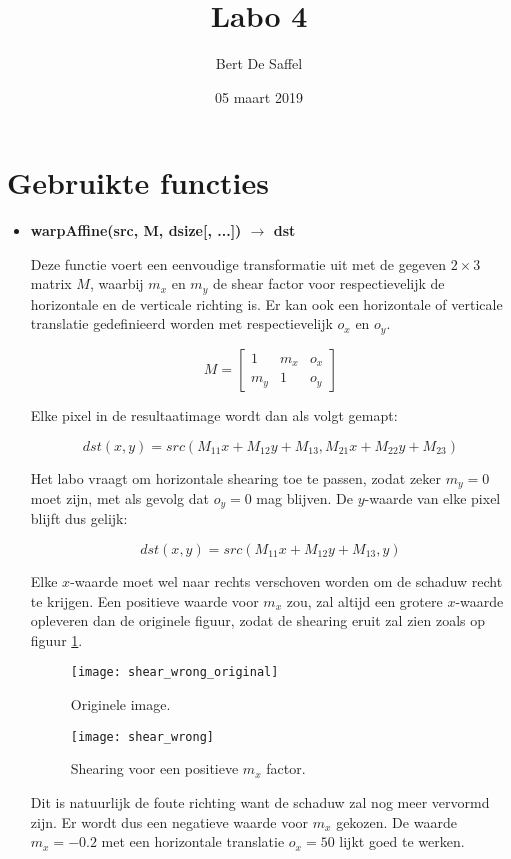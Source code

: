 \documentclass{article}
\begin{document}
	\title{Labo 4}
	\author{Bert De Saffel}
	\date{05 maart 2019}
	\maketitle
	
	\section{Gebruikte functies}
	\begin{itemize}
		 \item \textbf{warpAffine(src, M, dsize[, ...]) $\rightarrow$ dst}
		 
		 Deze functie voert een eenvoudige transformatie uit met de gegeven $2\times 3$ matrix $M$, waarbij $m_x$ en $m_y$ de shear factor voor respectievelijk de horizontale en de verticale richting is. Er kan ook een horizontale of verticale translatie gedefinieerd worden met respectievelijk $o_x$ en $o_y$.
		 
		 $$M = \begin{bmatrix}
		 1 & m_x & o_x \\
		 m_y & 1 & o_y
		 \end{bmatrix}$$
		 
		 Elke pixel in de resultaatimage wordt dan als volgt gemapt:
		 
		 $$dst(x, y) = src(M_{11}x + M_{12}y + M_{13}, M_{21}x + M_{22}y + M_{23})$$
		 
		 Het labo vraagt om horizontale shearing toe te passen, zodat zeker $m_y = 0$ moet zijn, met als gevolg dat $o_y = 0$ mag blijven. De $y$-waarde van elke pixel blijft dus gelijk:
		 
		 $$dst(x, y) = src(M_{11}x + M_{12}y + M_{13}, y) $$
		 
		 Elke $x$-waarde moet wel naar rechts verschoven worden om de schaduw recht te krijgen. Een positieve waarde voor $m_x$ zou, zal altijd een grotere $x$-waarde opleveren dan de originele figuur, zodat de shearing eruit zal zien zoals op figuur \ref{fig:shear_wrong}.
		\begin{figure}[!htb]
		 	\begin{minipage}{0.48\textwidth}
		 	\centering
			\texttt{[image: shear\_wrong\_original]}
			\caption{Originele image.}
			\label{fig:shear_wrong_original}
		 	\end{minipage}\hfill
		 	\begin{minipage}{0.48\textwidth}
		 	\centering
			\texttt{[image: shear\_wrong]}
			\caption{Shearing voor een positieve $m_x$ factor.}
			\label{fig:shear_wrong}
		 	\end{minipage}
		 \end{figure}
		 Dit is natuurlijk de foute richting want de schaduw zal nog meer vervormd zijn. Er wordt dus een negatieve waarde voor $m_x$ gekozen. De waarde $m_x = -0.2$ met een horizontale translatie $o_x = 50$ lijkt goed te werken.
		 

\end{itemize}
\end{document}
